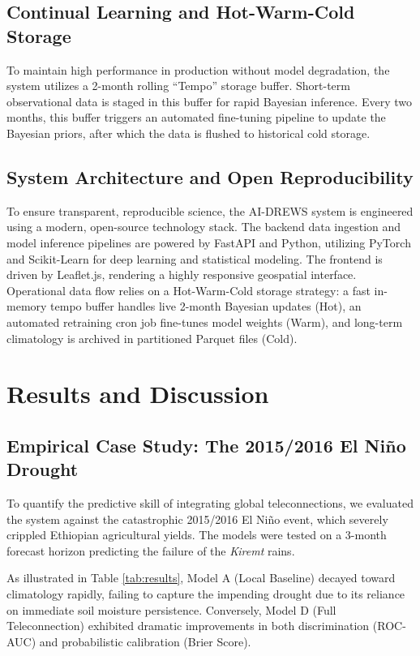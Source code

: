 \documentclass[3p,times]{elsarticle}
\begin{document}
\subsection{Continual Learning and Hot-Warm-Cold Storage}
To maintain high performance in production without model degradation, the system utilizes a 2-month rolling ``Tempo'' storage buffer. Short-term observational data is staged in this buffer for rapid Bayesian inference. Every two months, this buffer triggers an automated fine-tuning pipeline to update the Bayesian priors, after which the data is flushed to historical cold storage.

\subsection{System Architecture and Open Reproducibility}
To ensure transparent, reproducible science, the AI-DREWS system is engineered using a modern, open-source technology stack. The backend data ingestion and model inference pipelines are powered by FastAPI and Python, utilizing PyTorch and Scikit-Learn for deep learning and statistical modeling. The frontend is driven by Leaflet.js, rendering a highly responsive geospatial interface. Operational data flow relies on a Hot-Warm-Cold storage strategy: a fast in-memory tempo buffer handles live 2-month Bayesian updates (Hot), an automated retraining cron job fine-tunes model weights (Warm), and long-term climatology is archived in partitioned Parquet files (Cold).

\section{Results and Discussion}

\subsection{Empirical Case Study: The 2015/2016 El Ni\~no Drought}
To quantify the predictive skill of integrating global teleconnections, we evaluated the system against the catastrophic 2015/2016 El Ni\~no event, which severely crippled Ethiopian agricultural yields. The models were tested on a 3-month forecast horizon predicting the failure of the \textit{Kiremt} rains.

As illustrated in Table \ref{tab:results}, Model A (Local Baseline) decayed toward climatology rapidly, failing to capture the impending drought due to its reliance on immediate soil moisture persistence. Conversely, Model D (Full Teleconnection) exhibited dramatic improvements in both discrimination (ROC-AUC) and probabilistic calibration (Brier Score).
\end{document}
